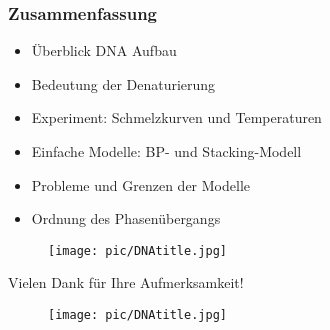 \begin{frame}
\frametitle{Zusammenfassung}
	\begin{minipage}{8cm}
\begin{itemize}
\item Überblick DNA Aufbau
\item Bedeutung der Denaturierung
\item Experiment: Schmelzkurven und Temperaturen
\item Einfache Modelle: BP- und Stacking-Modell
\item Probleme und Grenzen der Modelle
\item Ordnung des Phasenübergangs
\end{itemize}
	\end{minipage}
	\begin{minipage}{2cm}
		\centering \tiny \cite{TI14}
	\begin{figure}
		\centering
			\texttt{[image: pic/DNAtitle.jpg]}
	\end{figure}
	\end{minipage}
	\end{frame}
	
	

\begin{frame}
\vspace{1.2cm}
	\begin{minipage}{8cm}
\centering\large Vielen Dank für Ihre Aufmerksamkeit!
	\end{minipage}
	\begin{minipage}{2cm}
		\centering \tiny \cite{TI14}
	\begin{figure}
		\centering
			\texttt{[image: pic/DNAtitle.jpg]}
	\end{figure}
\end{minipage}
\end{frame}